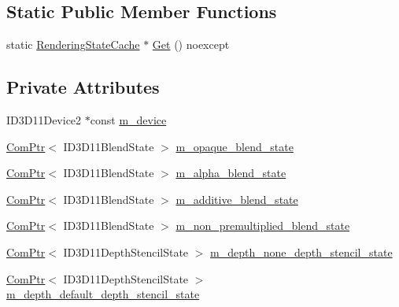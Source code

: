 \subsection*{Static Public Member Functions}
\begin{DoxyCompactItemize}
\item 
static \hyperlink{structmage_1_1_rendering_state_cache}{Rendering\+State\+Cache} $\ast$ \hyperlink{structmage_1_1_rendering_state_cache_a1792e037c8847d1d35219305bce42c52}{Get} () noexcept
\end{DoxyCompactItemize}
\subsection*{Private Attributes}
\begin{DoxyCompactItemize}
\item 
I\+D3\+D11\+Device2 $\ast$const \hyperlink{structmage_1_1_rendering_state_cache_ad1846bcede5c3e6c8ce631b504b45cdf}{m\+\_\+device}
\item 
\hyperlink{namespacemage_ae74f374780900893caa5555d1031fd79}{Com\+Ptr}$<$ I\+D3\+D11\+Blend\+State $>$ \hyperlink{structmage_1_1_rendering_state_cache_ac655dae04386c2998677dff61704c975}{m\+\_\+opaque\+\_\+blend\+\_\+state}
\item 
\hyperlink{namespacemage_ae74f374780900893caa5555d1031fd79}{Com\+Ptr}$<$ I\+D3\+D11\+Blend\+State $>$ \hyperlink{structmage_1_1_rendering_state_cache_a4eda3c0aeeaca45e4e07358267bb8ae6}{m\+\_\+alpha\+\_\+blend\+\_\+state}
\item 
\hyperlink{namespacemage_ae74f374780900893caa5555d1031fd79}{Com\+Ptr}$<$ I\+D3\+D11\+Blend\+State $>$ \hyperlink{structmage_1_1_rendering_state_cache_ae29d186475c245d3eb5701005631c655}{m\+\_\+additive\+\_\+blend\+\_\+state}
\item 
\hyperlink{namespacemage_ae74f374780900893caa5555d1031fd79}{Com\+Ptr}$<$ I\+D3\+D11\+Blend\+State $>$ \hyperlink{structmage_1_1_rendering_state_cache_adaf1dd35ebb8e0ad9f2135ad0efee67a}{m\+\_\+non\+\_\+premultiplied\+\_\+blend\+\_\+state}
\item 
\hyperlink{namespacemage_ae74f374780900893caa5555d1031fd79}{Com\+Ptr}$<$ I\+D3\+D11\+Depth\+Stencil\+State $>$ \hyperlink{structmage_1_1_rendering_state_cache_a2dfd8ceaab6604f77bda85900d0ebd0a}{m\+\_\+depth\+\_\+none\+\_\+depth\+\_\+stencil\+\_\+state}
\item 
\hyperlink{namespacemage_ae74f374780900893caa5555d1031fd79}{Com\+Ptr}$<$ I\+D3\+D11\+Depth\+Stencil\+State $>$ \hyperlink{structmage_1_1_rendering_state_cache_ad7f220ca4bc92d814e3e9044b0edf7e2}{m\+\_\+depth\+\_\+default\+\_\+depth\+\_\+stencil\+\_\+state}

\end{DoxyCompactItemize}
